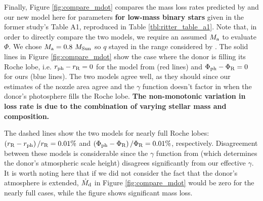 \documentclass{aastex}
\begin{document}
Finally, Figure \ref{fig:compare_mdot} compares the mass loss rates predicted by \citet{1988A&A...202...93R} and our new model here for parameters {\bf for low-mass binary stars} given in the former study's Table A1, reproduced in Table \ref{tbl:ritter_table_a1}. Note that, in order to directly compare the two models, we require an assumed $M_{\rm a}$ to evaluate $\Phi$. We chose $M_{\rm a} = 0.8\ M_{\rm Sun}$ so $q$ stayed in the range considered by \citet{1988A&A...202...93R}. The solid lines in Figure \ref{fig:compare_mdot} show the case where the donor is filling its Roche lobe, i.e. $r_{\rm ph} - r_{\rm R} = 0$ for the model from \citet{1988A&A...202...93R} (red lines) and $\Phi_{\rm ph} - \Phi_{\rm R} = 0$ for ours (blue lines). The two models agree well, as they should since our estimates of the nozzle area agree and the $\gamma$ function doesn't factor in when the donor's photosphere fills the Roche lobe. {\bf The non-monotonic variation in loss rate is due to the combination of varying stellar mass and composition.}



The dashed lines show the two models for nearly full Roche lobes: $\left( r_{\rm R} - r_{\rm ph} \right)/r_{\rm R} = 0.01\%$ and $\left( \Phi_{\rm ph} - \Phi_{\rm R} \right)/\Phi_{\rm R} = 0.01\%$, respectively. Disagreement between these models is considerable since the $\gamma$ function from \citet{1988A&A...202...93R} (which determines the donor's atmospheric scale height) disagrees significantly from our effective $\gamma$. It is worth noting here that if we did not consider the fact that the donor's atmosphere is extended, $\dot{M}_{\rm d}$ in Figure \ref{fig:compare_mdot} would be zero for the nearly full cases, while the figure shows significant mass loss.
\end{document}
